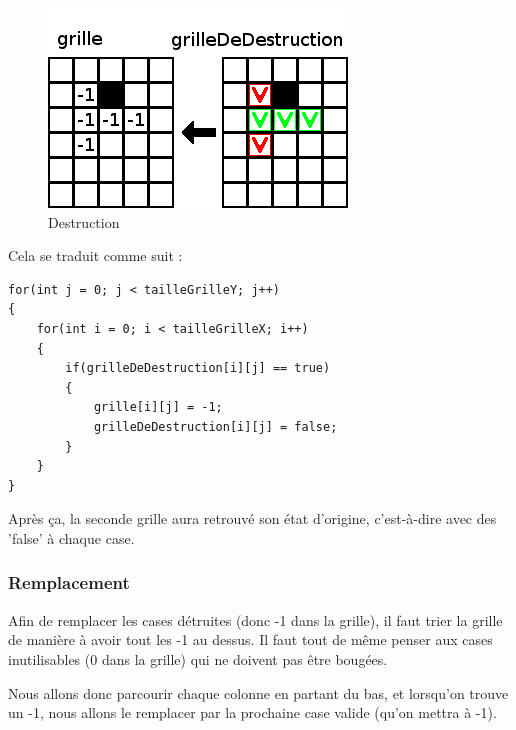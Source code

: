 \begin{figure}[ht]
	\center
	\caption{\label{Destruction} Destruction}
	\includegraphics{imgs/Destruction}
\end{figure}

Cela se traduit comme suit :

\begin{lstlisting}
for(int j = 0; j < tailleGrilleY; j++)
{
	for(int i = 0; i < tailleGrilleX; i++)
	{
		if(grilleDeDestruction[i][j] == true)
		{
			grille[i][j] = -1;
			grilleDeDestruction[i][j] = false;
		}
	}
}
\end{lstlisting}

Après ça, la seconde grille aura retrouvé son état d'origine, c'est-à-dire avec des 'false' à chaque case.

\subsubsection{Remplacement}

	Afin de remplacer les cases détruites (donc -1 dans la grille), il faut trier la grille de manière à avoir tout les -1 au dessus.
	Il faut tout de même penser aux cases inutilisables (0 dans la grille) qui ne doivent pas être bougées.
	
	Nous allons donc parcourir chaque colonne en partant du bas, et lorsqu'on trouve un -1, nous allons le remplacer par la prochaine case valide (qu'on mettra à -1).
	
